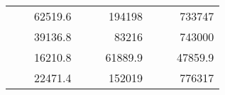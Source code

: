 \begin{table}[H]
\begin{tabular}{|ccrccrccc}
\rowcolor[HTML]{DDFDFF} 
\multicolumn{1}{|c|}{\cellcolor[HTML]{FFFFC7}}                                & \multicolumn{1}{c|}{\cellcolor[HTML]{DDFDFF}}                      & \multicolumn{1}{r|}{\cellcolor[HTML]{DAE8FC}62519.6}   & \multicolumn{1}{c|}{\cellcolor[HTML]{FFFFC7}}                                & \multicolumn{1}{c|}{\cellcolor[HTML]{DDFDFF}}                       & \multicolumn{1}{r|}{\cellcolor[HTML]{DDFDFF}194198}    & \multicolumn{1}{c|}{\cellcolor[HTML]{FFFFC7}}                                & \multicolumn{1}{c|}{\cellcolor[HTML]{DDFDFF}}                      & \multicolumn{1}{r|}{\cellcolor[HTML]{DDFDFF}733747}    \\ \cline{3-3} \cline{6-6} \cline{9-9} 
\multicolumn{1}{|c|}{\cellcolor[HTML]{FFFFC7}}                                & \multicolumn{1}{c|}{\cellcolor[HTML]{DDFDFF}}                      & \multicolumn{1}{r|}{\cellcolor[HTML]{DDFDFF}39136.8}   & \multicolumn{1}{c|}{\cellcolor[HTML]{FFFFC7}}                                & \multicolumn{1}{c|}{\cellcolor[HTML]{DDFDFF}}                       & \multicolumn{1}{r|}{\cellcolor[HTML]{DAE8FC}83216}     & \multicolumn{1}{c|}{\cellcolor[HTML]{FFFFC7}}                                & \multicolumn{1}{c|}{\cellcolor[HTML]{DDFDFF}}                      & \multicolumn{1}{r|}{\cellcolor[HTML]{DAE8FC}743000}    \\ \cline{3-3} \cline{6-6} \cline{9-9} 
\rowcolor[HTML]{DDFDFF} 
\multicolumn{1}{|c|}{\cellcolor[HTML]{FFFFC7}}                                & \multicolumn{1}{c|}{\cellcolor[HTML]{DDFDFF}}                      & \multicolumn{1}{r|}{\cellcolor[HTML]{DAE8FC}16210.8}   & \multicolumn{1}{c|}{\cellcolor[HTML]{FFFFC7}}                                & \multicolumn{1}{c|}{\cellcolor[HTML]{DDFDFF}}                       & \multicolumn{1}{r|}{\cellcolor[HTML]{DDFDFF}61889.9}   & \multicolumn{1}{c|}{\cellcolor[HTML]{FFFFC7}}                                & \multicolumn{1}{c|}{\cellcolor[HTML]{DDFDFF}}                      & \multicolumn{1}{r|}{\cellcolor[HTML]{DDFDFF}47859.9}   \\ \cline{3-3} \cline{6-6} \cline{9-9} 
\multicolumn{1}{|c|}{\cellcolor[HTML]{FFFFC7}}                                & \multicolumn{1}{c|}{\cellcolor[HTML]{DDFDFF}}                      & \multicolumn{1}{r|}{\cellcolor[HTML]{DDFDFF}22471.4}   & \multicolumn{1}{c|}{\cellcolor[HTML]{FFFFC7}}                                & \multicolumn{1}{c|}{\cellcolor[HTML]{DDFDFF}}                       & \multicolumn{1}{r|}{\cellcolor[HTML]{DAE8FC}152019}    & \multicolumn{1}{c|}{\cellcolor[HTML]{FFFFC7}}                                & \multicolumn{1}{c|}{\cellcolor[HTML]{DDFDFF}}                      & \multicolumn{1}{r|}{\cellcolor[HTML]{DAE8FC}776317}    \\ \cline{3-3} \cline{6-6} \cline{9-9} 

\end{tabular}
\end{table}
